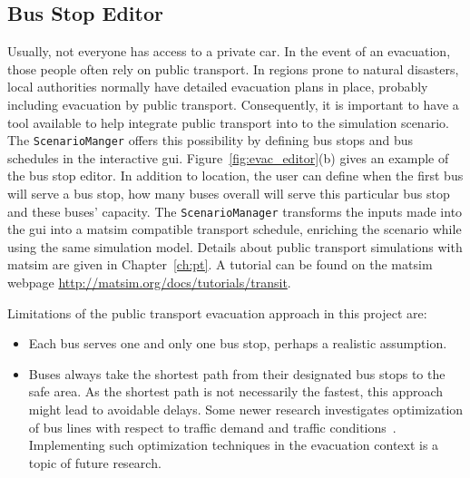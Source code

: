 \subsection{Bus Stop Editor}
Usually, not everyone has access to a private car. In the event of an evacuation, those people often rely on public transport. In regions prone to natural disasters, local authorities normally have detailed evacuation plans in place, probably including evacuation by public transport. Consequently, it is important to have a tool available to help integrate public transport into to the simulation scenario. The \lstinline|ScenarioManger| offers this possibility by defining bus stops and bus schedules in the interactive \gls{gui}. Figure~\ref{fig:evac_editor}(b) gives an example of the bus stop editor. In addition to location, the user can define when the first bus will serve a bus stop, how many buses overall will serve this particular bus stop and these buses' capacity. 
The \lstinline|ScenarioManager| transforms the inputs made into the \gls{gui} into a \gls{matsim} compatible transport schedule, enriching the scenario while using the same simulation model. Details about public transport simulations with \gls{matsim} are given in Chapter~\ref{ch:pt}. A tutorial can be found on the \gls{matsim} webpage \url{http://matsim.org/docs/tutorials/transit}.

Limitations of the public transport evacuation approach in this project are:
\begin{itemize}\styleItemize
\item Each bus serves one and only one bus stop, perhaps a realistic assumption.
\item Buses always take the shortest path from their designated bus stops to the safe area. As the shortest path is not necessarily the fastest, this approach might lead to avoidable delays. Some newer research investigates optimization of bus lines with respect to traffic demand and traffic conditions~\citep{Neumann2014PhD}. Implementing such optimization techniques in the evacuation context is a topic of future research.
\end{itemize}

